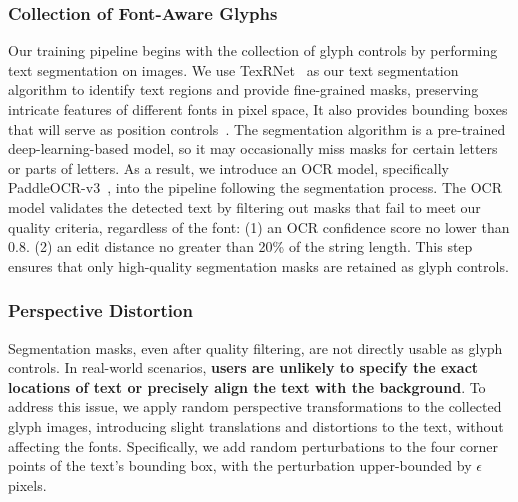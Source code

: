 \subsubsection{Collection of Font-Aware Glyphs} \label{sec:prepare_glyph}
Our training pipeline begins with the collection of glyph controls by performing text segmentation on images. We use TexRNet~\cite{xu2021rethinking} as our text segmentation algorithm to identify text regions and provide fine-grained masks, preserving intricate features of different fonts in pixel space, It also provides bounding boxes that will serve as position controls~\cite{tuo2023anytext}. 
The segmentation algorithm is a pre-trained deep-learning-based model, so it may occasionally miss masks for certain letters or parts of letters. As a result, we introduce an OCR model, specifically PaddleOCR-v3~\cite{du2020pp}, into the pipeline following the segmentation process. The OCR model validates the detected text by filtering out masks that fail to meet our quality criteria, regardless of the font: (1) an OCR confidence score no lower than 0.8. (2) an edit distance no greater than 20\% of the string length. This step ensures that only high-quality segmentation masks are retained as glyph controls.


\subsubsection{Perspective Distortion}
Segmentation masks, even after quality filtering, are not directly usable as glyph controls. In real-world scenarios, \textbf{users are unlikely to specify the exact locations of text or precisely align the text with the background}. To address this issue, we apply random perspective transformations to the collected glyph images, introducing slight translations and distortions to the text, without affecting the fonts. Specifically, we add random perturbations to the four corner points of the text's bounding box, with the perturbation upper-bounded by $\epsilon$ pixels.

